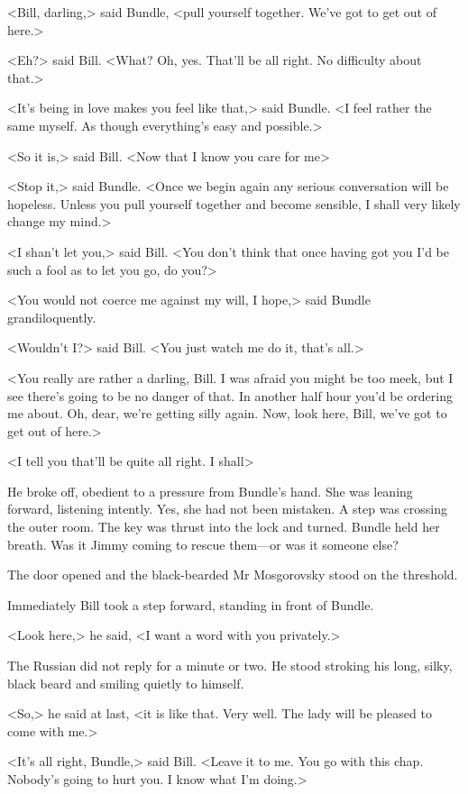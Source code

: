 <Bill, darling,> said Bundle, <pull yourself together. We've got to get out of here.>

<Eh?> said Bill. <What? Oh, yes. That'll be all right. No difficulty about that.>

<It's being in love makes you feel like that,> said Bundle. <I feel rather the same myself. As though everything's easy and possible.>

<So it is,> said Bill. <Now that I know you care for me\longdash>

<Stop it,> said Bundle. <Once we begin again any serious conversation will be hopeless. Unless you pull yourself together and become sensible, I shall very likely change my mind.>

<I shan't let you,> said Bill. <You don't think that once having got you I'd be such a fool as to let you go, do you?>

<You would not coerce me against my will, I hope,> said Bundle grandiloquently.

<Wouldn't I?> said Bill. <You just watch me do it, that's all.>

<You really are rather a darling, Bill. I was afraid you might be too meek, but I see there's going to be no danger of that. In another half hour you'd be ordering me about. Oh, dear, we're getting silly again. Now, look here, Bill, we've got to get out of here.>

<I tell you that'll be quite all right. I shall\longdash>

He broke off, obedient to a pressure from Bundle's hand. She was leaning forward, listening intently. Yes, she had not been mistaken. A step was crossing the outer room. The key was thrust into the lock and turned. Bundle held her breath. Was it Jimmy coming to rescue them—or was it someone else?

The door opened and the black-bearded Mr Mosgorovsky stood on the threshold.

Immediately Bill took a step forward, standing in front of Bundle.

<Look here,> he said, <I want a word with you privately.>

The Russian did not reply for a minute or two. He stood stroking his long, silky, black beard and smiling quietly to himself.

<So,> he said at last, <it is like that. Very well. The lady will be pleased to come with me.>

<It's all right, Bundle,> said Bill. <Leave it to me. You go with this chap. Nobody's going to hurt you. I know what I'm doing.>

